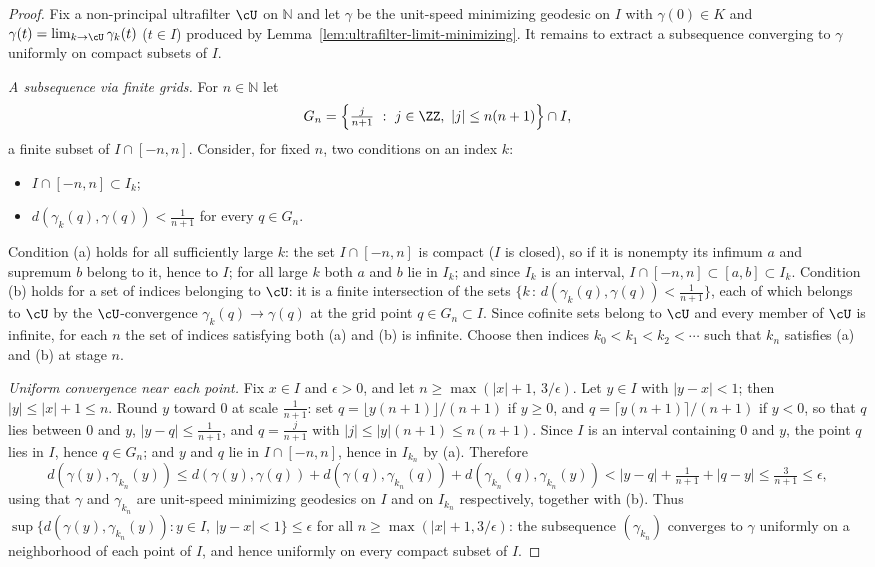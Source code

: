 \begin{proof}
\leanok
{}
Fix a non-principal ultrafilter $\cU$ on $\mathbb{N}$ and let
$\gamma$ be the unit-speed minimizing geodesic on $I$ with
$\gamma(0)\in K$ and $\gamma(t)=\lim_{k\rightarrow\cU}\gamma_k(t)$
($t\in I$) produced by
Lemma~\ref{lem:ultrafilter-limit-minimizing}. It remains to extract
a subsequence converging to $\gamma$ uniformly on compact subsets of
$I$.

{\em A subsequence via finite grids.} For $n\in\mathbb{N}$ let
$$G_n=\left\{\tfrac{j}{n+1}\ :\ j\in\ZZ,\ |j|\le n(n+1)\right\}\cap
I,$$
a finite subset of $I\cap[-n,n]$. Consider, for fixed $n$, two
conditions on an index $k$:
\begin{itemize}
\item[(a)] $I\cap[-n,n]\subset I_k$;
\item[(b)] $d(\gamma_k(q),\gamma(q))<\tfrac1{n+1}$ for every $q\in
G_n$.
\end{itemize}
Condition (a) holds for all sufficiently large $k$: the set
$I\cap[-n,n]$ is compact ($I$ is closed), so if it is nonempty its
infimum $a$ and supremum $b$ belong to it, hence to $I$; for all
large $k$ both $a$ and $b$ lie in $I_k$; and since $I_k$ is an
interval, $I\cap[-n,n]\subset[a,b]\subset I_k$. Condition (b) holds
for a set of indices belonging to $\cU$: it is a finite intersection
of the sets $\{k\,:\,d(\gamma_k(q),\gamma(q))<\tfrac1{n+1}\}$, each
of which belongs to $\cU$ by the $\cU$-convergence
$\gamma_k(q)\rightarrow\gamma(q)$ at the grid point $q\in G_n\subset
I$. Since cofinite sets belong to $\cU$ and every member of $\cU$ is
infinite, for each $n$ the set of indices satisfying both (a) and
(b) is infinite. Choose then indices $k_0<k_1<k_2<\cdots$ such that
$k_n$ satisfies (a) and (b) at stage $n$.

{\em Uniform convergence near each point.} Fix $x\in I$ and
$\epsilon>0$, and let $n\ge\max(|x|+1,\,3/\epsilon)$. Let $y\in I$
with $|y-x|<1$; then $|y|\le|x|+1\le n$. Round $y$ toward $0$ at
scale $\tfrac1{n+1}$: set $q=\lfloor y(n+1)\rfloor/(n+1)$ if
$y\ge0$, and $q=\lceil y(n+1)\rceil/(n+1)$ if $y<0$, so that $q$
lies between $0$ and $y$, $|y-q|\le\tfrac1{n+1}$, and
$q=\tfrac{j}{n+1}$ with $|j|\le|y|(n+1)\le n(n+1)$. Since $I$ is an
interval containing $0$ and $y$, the point $q$ lies in $I$, hence
$q\in G_n$; and $y$ and $q$ lie in $I\cap[-n,n]$, hence in
$I_{k_n}$ by (a). Therefore
$$d(\gamma(y),\gamma_{k_n}(y))\le
d(\gamma(y),\gamma(q))+d(\gamma(q),\gamma_{k_n}(q))
+d(\gamma_{k_n}(q),\gamma_{k_n}(y))
<|y-q|+\tfrac1{n+1}+|q-y|\le\tfrac3{n+1}\le\epsilon,$$
using that $\gamma$ and $\gamma_{k_n}$ are unit-speed minimizing
geodesics on $I$ and on $I_{k_n}$ respectively, together with (b).
Thus $\sup\{d(\gamma(y),\gamma_{k_n}(y)):y\in I,\ |y-x|<1\}\le
\epsilon$ for all $n\ge\max(|x|+1,3/\epsilon)$: the subsequence
$(\gamma_{k_n})$ converges to $\gamma$ uniformly on a neighborhood
of each point of $I$, and hence uniformly on every compact subset
of $I$.
\end{proof}

